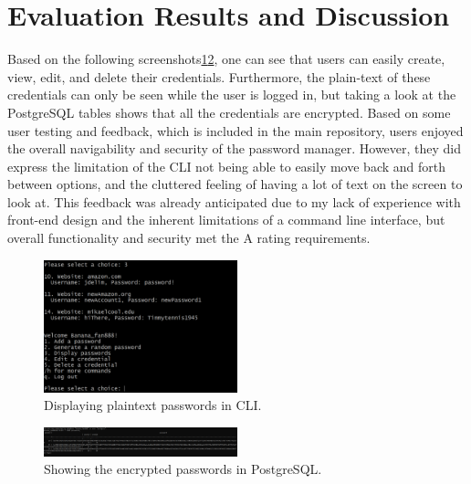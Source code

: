 \documentclass[10pt,twocolumn]{article}
\begin{document}
\section{Evaluation Results and Discussion}

Based on the following screenshots\ref{DisplayPassCLI}\ref{PSQLResults}, one can see that users can easily create, view, edit, and delete their credentials. Furthermore, the plain-text of these credentials can only be seen while the user is logged in, but taking a look at the PostgreSQL tables shows that all the credentials are encrypted. Based on some user testing and feedback, which is included in the main repository, users enjoyed the overall navigability and security of the password manager. However, they did express the limitation of the CLI not being able to easily move back and forth between options, and the cluttered feeling of having a lot of text on the screen to look at. This feedback was already anticipated due to my lack of experience with front-end design and the inherent limitations of a command line interface, but overall functionality and security met the A rating requirements.
\begin{figure}[h]
    \centering
    \includegraphics[width=0.5\textwidth]{evalResults.PNG}
    \caption{Displaying plaintext passwords in CLI.}
    \label{DisplayPassCLI}
\end{figure}

\begin{figure}[h]
    \centering
    \includegraphics[width=0.5\textwidth]{PSQLResults.PNG}
    \caption{Showing the encrypted passwords in PostgreSQL.}
    \label{PSQLResults}
\end{figure}
\end{document}
